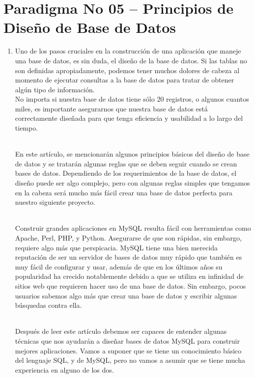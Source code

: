 \section{Paradigma No 05 – Principios de Diseño de Base de Datos} 

\begin{enumerate}[1.]
	\item Uno de los pasos cruciales en la construcción de una aplicación que maneje una base de datos, es sin duda, el diseño de la base de datos. Si las tablas no son definidas apropiadamente, podemos tener muchos dolores de cabeza al momento de ejecutar consultas a la base de datos para tratar de obtener algún tipo de información.
	\\No importa si nuestra base de datos tiene sólo 20 registros, o algunos cuantos miles, es importante asegurarnos que nuestra base de datos está correctamente diseñada para que tenga eficiencia y usabilidad a lo largo del tiempo.

\\En este artículo, se mencionarán algunos principios básicos del diseño de base de datos y se tratarán algunas reglas que se deben seguir cuando se crean bases de datos. Dependiendo de los requerimientos de la base de datos, el diseño puede ser algo complejo, pero con algunas reglas simples que tengamos en la cabeza será mucho más fácil crear una base de datos perfecta para nuestro siguiente proyecto.

\\Construir grandes aplicaciones en MySQL resulta fácil con herramientas como Apache, Perl, PHP, y Python. Asegurarse de que son rápidas, sin embargo, requiere algo más que perspicacia. MySQL tiene una bien merecida reputación de ser un servidor de bases de datos muy rápido que también es muy fácil de configurar y usar, además de que en los últimos años su popularidad ha crecido notablemente debido a que se utiliza en infinidad de sitios web que requieren hacer uso de una base de datos. Sin embargo, pocos usuarios sabemos algo más que crear una base de datos y escribir algunas búsquedas contra ella.

\\Después de leer este artículo debemos ser capaces de entender algunas técnicas que nos ayudarán a diseñar bases de datos MySQL para construir mejores aplicaciones. Vamos a suponer que se tiene un conocimiento básico del lenguaje SQL, y de MySQL, pero no vamos a asumir que se tiene mucha experiencia en alguno de los dos.
	

\end{enumerate}

